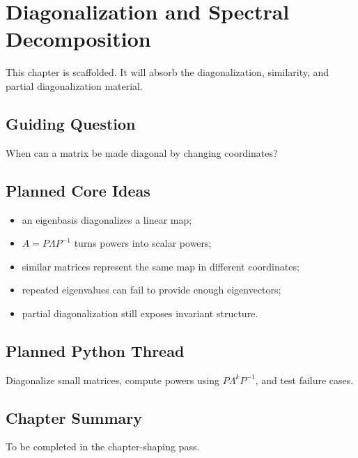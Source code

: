 \chapter{Diagonalization and Spectral Decomposition}
\label{ch:diagonalization-spectral-decomposition}

\begin{draftbox}
This chapter is scaffolded. It will absorb the diagonalization, similarity, and
partial diagonalization material.
\end{draftbox}

\section{Guiding Question}

When can a matrix be made diagonal by changing coordinates?

\section{Planned Core Ideas}

\begin{itemize}
  \item an eigenbasis diagonalizes a linear map;
  \item $A=P\Lambda P^{-1}$ turns powers into scalar powers;
  \item similar matrices represent the same map in different coordinates;
  \item repeated eigenvalues can fail to provide enough eigenvectors;
  \item partial diagonalization still exposes invariant structure.
\end{itemize}

\section{Planned Python Thread}

Diagonalize small matrices, compute powers using $P\Lambda^kP^{-1}$, and test
failure cases.

\section*{Chapter Summary}

To be completed in the chapter-shaping pass.


